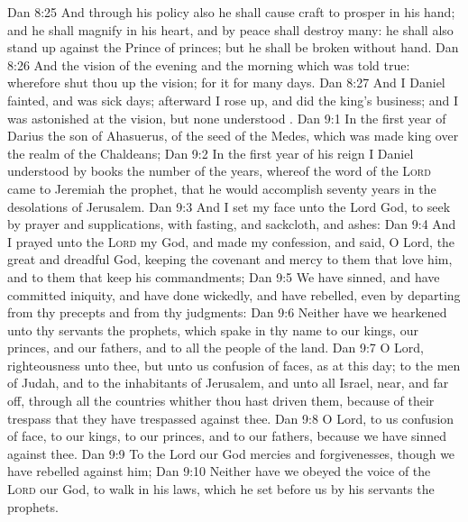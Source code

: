 \vs Dan 8:25 And through his policy also he shall cause craft to prosper in his hand; and he shall magnify  in his heart, and by peace shall destroy many: he shall also stand up against the Prince of princes; but he shall be broken without hand.
\vs Dan 8:26 And the vision of the evening and the morning which was told  true: wherefore shut thou up the vision; for it  for many days.
\vs Dan 8:27 And I Daniel fainted, and was sick  days; afterward I rose up, and did the king's business; and I was astonished at the vision, but none understood .
\vs Dan 9:1 In the first year of Darius the son of Ahasuerus, of the seed of the Medes, which was made king over the realm of the Chaldeans;
\vs Dan 9:2 In the first year of his reign I Daniel understood by books the number of the years, whereof the word of the \textsc{Lord} came to Jeremiah the prophet, that he would accomplish seventy years in the desolations of Jerusalem.
\vs Dan 9:3 And I set my face unto the Lord God, to seek by prayer and supplications, with fasting, and sackcloth, and ashes:
\vs Dan 9:4 And I prayed unto the \textsc{Lord} my God, and made my confession, and said, O Lord, the great and dreadful God, keeping the covenant and mercy to them that love him, and to them that keep his commandments;
\vs Dan 9:5 We have sinned, and have committed iniquity, and have done wickedly, and have rebelled, even by departing from thy precepts and from thy judgments:
\vs Dan 9:6 Neither have we hearkened unto thy servants the prophets, which spake in thy name to our kings, our princes, and our fathers, and to all the people of the land.
\vs Dan 9:7 O Lord, righteousness  unto thee, but unto us confusion of faces, as at this day; to the men of Judah, and to the inhabitants of Jerusalem, and unto all Israel,  near, and  far off, through all the countries whither thou hast driven them, because of their trespass that they have trespassed against thee.
\vs Dan 9:8 O Lord, to us  confusion of face, to our kings, to our princes, and to our fathers, because we have sinned against thee.
\vs Dan 9:9 To the Lord our God  mercies and forgivenesses, though we have rebelled against him;
\vs Dan 9:10 Neither have we obeyed the voice of the \textsc{Lord} our God, to walk in his laws, which he set before us by his servants the prophets.
